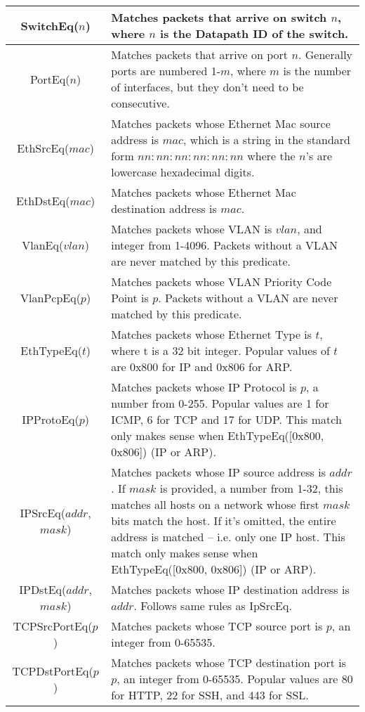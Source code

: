 \bigskip
\begin{tabularx}{6in}{|c|X|}
\hline\hline
SwitchEq($n$) & Matches packets that arrive on switch $n$, where $n$ is the Datapath ID of the switch.  
\\ \hline
PortEq($n$) & Matches packets that arrive on port $n$.  Generally ports are numbered 1-$m$, where $m$ is the
number of interfaces, but they don't need to be consecutive.  
\\ \hline
EthSrcEq($mac$) & Matches packets whose Ethernet Mac source address is $mac$, which is a string in the standard form $nn:nn:nn:nn:nn:nn$ where the $n$'s are lowercase hexadecimal digits.
\\ \hline
EthDstEq($mac$) & Matches packets whose Ethernet Mac destination address is $mac$.
\\ \hline
VlanEq($vlan$) & Matches packets whose VLAN is $vlan$, and integer from 1-4096.  Packets without a VLAN are never matched by this predicate.
\\ \hline
VlanPcpEq($p$) & Matches packets whose VLAN Priority Code Point is $p$.  Packets without a VLAN are never matched by this predicate.
\\ \hline
EthTypeEq($t$) & Matches packets whose Ethernet Type is $t$, where t is a 32 bit integer.  Popular values of $t$ are 0x800 for IP and 0x806 for ARP.  
\\ \hline
IPProtoEq($p$) & Matches packets whose IP Protocol is $p$, a number from 0-255.  
Popular values are 1 for ICMP, 6 for TCP and 17 for UDP.  
This match only makes sense when EthTypeEq([0x800, 0x806]) (IP or ARP). 
\\ \hline
IPSrcEq($addr$, $mask$) & Matches packets whose IP source address is $addr$.  
If $mask$ is provided, a number from 1-32, this matches all hosts on a network whose first $mask$ bits match the host.
If it's omitted, the entire address is matched -- i.e. only one IP host.  
This match only makes sense when EthTypeEq([0x800, 0x806]) (IP or ARP). 
\\ \hline
IPDstEq($addr$, $mask$) & Matches packets whose IP destination address is $addr$.  
Follows same rules as IpSrcEq.
\\ \hline
TCPSrcPortEq($p$) & Matches packets whose TCP source port is $p$, an integer from 0-65535.
\\ \hline
TCPDstPortEq($p$) & Matches packets whose TCP destination port is $p$, an integer from 0-65535.
Popular values are 80 for HTTP, 22 for SSH, and 443 for SSL.  
\end{tabularx}

